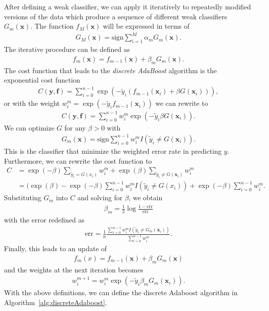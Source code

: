 After defining a weak classifier, we can apply it iteratively to repeatedly modified versions of the data which produce a sequence of different weak classifiers $G_m(\textbf{x})$. The function $f_M(\textbf{x})$ will be expressed in terms of
\begin{align}
  G_M(\textbf{x})=\text{sign}\sum_{i=1}^M \alpha_mG_m(\textbf{x}).
\end{align}
The iterative procedure can be defined as
\begin{align}
  f_m(\textbf{x}) = f_{m-1}(\textbf{x}) + \beta_mG_m(\textbf{x}).
\end{align}
The cost function that leads to the \textit{discrete AdaBoost}  algorithm \cite{Friedman2000} is the exponential cost function
\begin{align}
  C(\textbf{y},\textbf{f}) = \sum_{i=0}^{n-1} \exp (-\tilde{y}_i(f_{m-1}(\textbf{x}_i) + \beta G(\textbf{x}_i))),
\end{align}
or with the weight $w_i^m = \exp(-\tilde{y}_if_{m-1}(\textbf{x}_i))$ we can rewrite to
\begin{align}
  C(\textbf{y},\textbf{f}) = \sum_{i=0}^{n-1} w_i^m \exp(-\tilde{y}_i\beta G(\textbf{x}_i)).
\end{align}
We can optimize $G$ for any $\beta>0$ with
\begin{align}
  G_m(\textbf{x}) = \text{sign} \sum_{i=0}^{n-1} w_i^m I(\tilde{y}_i \neq G(\textbf{x}_i)).
\end{align}
This is the classifier that minimize the weighted error rate in predicting $y$. Furthermore, we can rewrite the cost function to
\begin{align}
    C &= \exp(-\beta) \sum_{\tilde{y}_i=G(x_i)} w_i^m + \exp (\beta) \sum_{\tilde{y}_i \neq G(\textbf{x}_i)} w_i^m \\
    &= (\exp(\beta)-\exp(-\beta)\sum_{i=0}^{n-1} w_i^m I(\tilde{y}_i \neq G(x_i)) + \exp(-\beta)\sum_{i=0}^{n-1}w_i^m .
\end{align}
Substituting $G_m$ into $C$ and solving for $\beta$, we obtain
\begin{align}
  \beta_m = \frac{1}{2} \log \frac{1 - \overline{\text{err}}}{\overline{\text{err}}}
\end{align}
with the error redefined as
\begin{align}
  \overline{\text{err}} = \frac{1}{n} \frac{ \sum_{i=0}^{n-1} w_i^m I(\tilde{y}_i \neq G_m(\textbf{x}_i)) }{\sum_{i=0}^{n-1} w_i^m}.
\end{align}
Finally, this leads to an update of
\begin{align}
  f_m(x) = f_{m-1}(\textbf{x}) + \beta_m G_m (\textbf{x})
\end{align}
and the weights at the next iteration becomes
\begin{align}
  w_i^{m+1} = w_i^m \exp (-\tilde{y}_i \beta_m G_m(\textbf{x}_i)).
\end{align}
With the above definitions, we can define the discrete Adaboost algorithm in Algorithm~\ref{alg:discreteAdaboost}.

